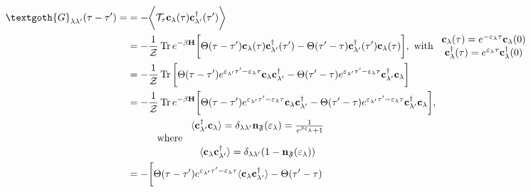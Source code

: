 \begin{equation}
\begin{split}
    \textgoth{G}_{\lambda \lambda'}(\tau - \tau') =
    &= - \bigg \langle \mathcal{T}_{\tau} {\bf c}_{\lambda}(\tau) {\bf c}_{\lambda'}^\dagger(\tau') \bigg \rangle \\
    &= - \frac{1}{\mathcal{Z}} \Tr e^{-\beta {\bf H}} \bigg[\Theta(\tau - \tau') {\bf c}_{\lambda}(\tau) {\bf c}_{\lambda'}^\dagger(\tau') - \Theta(\tau' - \tau) {\bf c}_{\lambda'}^\dagger(\tau') {\bf c}_{\lambda}(\tau) \bigg], \textnormal{ with } \begin{array}{cc}
         {\bf c}_{\lambda}(\tau) = e^{-\varepsilon_{\lambda} \tau} {\bf c}_{\lambda}(0) \\
         {\bf c}_{\lambda}^\dagger(\tau) = e^{\varepsilon_{\lambda} \tau} {\bf c}_{\lambda}^\dagger(0)
    \end{array} \\
    &= - \frac{1}{\mathcal{Z}} \Tr \bigg[
    \Theta(\tau - \tau') 
    e^{\varepsilon_{\lambda'} \tau'-\varepsilon_{\lambda} \tau} {\bf c}_{\lambda} {\bf c}_{\lambda'}^\dagger
    - \Theta(\tau' - \tau) 
    e^{\varepsilon_{\lambda'} \tau' - \varepsilon_{\lambda} \tau} {\bf c}_{\lambda'}^\dagger {\bf c}_{\lambda}
    \bigg] \\
    &= - \frac{1}{\mathcal{Z}} \Tr e^{-\beta {\bf H}}
    \bigg[
    \Theta(\tau - \tau') 
    e^{\varepsilon_{\lambda'} \tau'-\varepsilon_{\lambda} \tau} {\bf c}_{\lambda} {\bf c}_{\lambda'}^\dagger
    - \Theta(\tau' - \tau) 
    e^{\varepsilon_{\lambda'} \tau' - \varepsilon_{\lambda} \tau} {\bf c}_{\lambda'}^\dagger {\bf c}_{\lambda}
    \bigg], \\
    & \blanky \blanky \blanky \blanky \blanky \blanky \blanky \blanky \textnormal{ where } \begin{array}{cc}
         \langle {\bf c}_{\lambda'}^\dagger {\bf c}_{\lambda} \rangle = \delta_{\lambda \lambda'} {\bf n}_{\mathfrak{F}}(\varepsilon_{\lambda}) = \frac{1}{e^{\beta \varepsilon_{\lambda}} + 1} \\
         \\
         \langle {\bf c}_{\lambda} {\bf c}_{\lambda'}^\dagger \rangle = \delta_{\lambda \lambda'} ( 1 - {\bf n}_{\mathfrak{F}}(\varepsilon_{\lambda}) )
    \end{array}  \\
    &= -  
    \bigg[
    \Theta(\tau - \tau') 
    e^{\varepsilon_{\lambda'} \tau'-\varepsilon_{\lambda} \tau} \langle {\bf c}_{\lambda} {\bf c}_{\lambda'}^\dagger \rangle
    - \Theta(\tau' - \tau) 

\end{split}
\end{equation}
